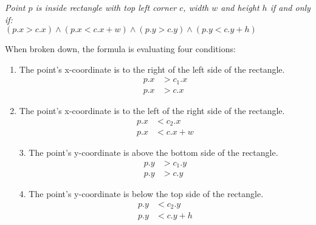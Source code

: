 \begin{center}
    \textit{Point $p$ is inside rectangle with top left corner $c$, width $w$ and height $h$ if and only if:} \\
    $(p.x > c.x) \land (p.x < c.x + w) \land (p.y > c.y) \land (p.y < c.y + h)$
\end{center}
When broken down, the formula is evaluating four conditions:
\begin{multicols}{2}
    \begin{enumerate}
        \item The point's x-coordinate is to the right of the left side of the rectangle.
              \begin{equation*}
                  \begin{aligned}
                      p.x & > c_1.x \\
                      p.x & > c.x
                  \end{aligned}
              \end{equation*}

        \item The point's x-coordinate is to the left of the right side of the rectangle.
              \begin{equation*}
                  \begin{aligned}
                      p.x & < c_2.x   \\
                      p.x & < c.x + w
                  \end{aligned}
              \end{equation*}
    \end{enumerate}
\end{multicols}

\begin{multicols}{2}
    \begin{enumerate}
        \item[3.]The point's y-coordinate is above the bottom side of the rectangle.
        \begin{equation*}
            \begin{aligned}
                p.y & > c_1.y \\
                p.y & > c.y
            \end{aligned}
        \end{equation*}

        \item[4.] The point's y-coordinate is below the top side of the rectangle.
            \begin{equation*}
                \begin{aligned}
                    p.y & < c_2.y   \\
                    p.y & < c.y + h
                \end{aligned}
            \end{equation*}
    \end{enumerate}
\end{multicols}
\newpage

